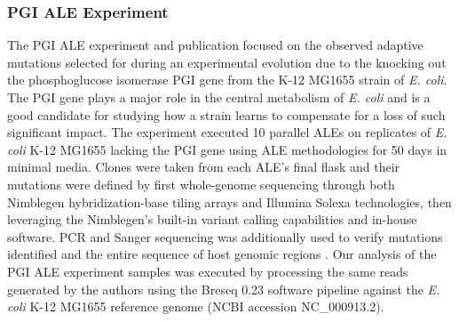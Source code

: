 \documentclass[12pt,final,masters,chapterheads]{ucsd}  %
\begin{document}
\subsubsection{PGI ALE Experiment}
%
%
The PGI ALE experiment and publication focused on the observed adaptive mutations selected for during an experimental evolution due to the knocking out the phosphoglucose isomerase PGI gene from the K-12 MG1655 strain of \textit{E. coli}. The PGI gene plays a major role in the central metabolism of \textit{E. coli} and is a good candidate for studying how a strain learns to compensate for a loss of such significant impact. The experiment executed 10 parallel ALEs on replicates of \textit{E. coli} K-12 MG1655 lacking the PGI gene using ALE methodologies for 50 days in minimal media. Clones were taken from each ALE's final flask and their mutations were defined by first whole-genome sequencing through both Nimblegen hybridization-base tiling arrays and Illumina Solexa technologies, then leveraging the Nimblegen's built-in variant calling capabilities and in-house software. PCR and Sanger sequencing was additionally used to verify mutations identified and the entire sequence of host genomic regions \cite{10.1371/journal.pgen.1001186}. Our analysis of the PGI ALE experiment samples was executed by processing the same reads generated by the authors using the Breseq 0.23 software pipeline against the \textit{E. coli} K-12 MG1655 reference genome (NCBI accession NC\_000913.2).
%
%
%
%
\end{document}

